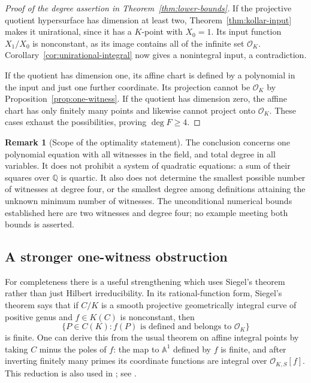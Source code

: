 \documentclass[11pt]{article}
\theoremstyle{definition}
\newtheorem{remark}[theorem]{Remark}
\begin{document}
\begin{proof}[Proof of the degree assertion in Theorem~\ref{thm:lower-bounds}]
If the projective quotient hypersurface has dimension at least two,
Theorem~\ref{thm:kollar-input} makes it unirational, since it has a
$K$-point with $X_0=1$.  Its input function $X_1/X_0$ is nonconstant,
as its image contains all of the infinite set $\mathcal O_K$.
Corollary~\ref{cor:unirational-integral} now gives a nonintegral input,
a contradiction.

If the quotient has dimension one, its affine chart is defined by a
polynomial in the input and just one further coordinate.  Its projection
cannot be $\mathcal O_K$ by Proposition~\ref{prop:one-witness}.
If the quotient has dimension zero, the affine chart has only finitely
many points and likewise cannot project onto $\mathcal O_K$.
These cases exhaust the possibilities, proving $\deg F\ge4$.
\end{proof}

\begin{remark}[Scope of the optimality statement]
The conclusion concerns one polynomial equation with all witnesses in the
field, and total degree in all variables.  It does not prohibit a system
of quadratic equations: a sum of their squares over $\mathbb Q$ is quartic.
It also does not determine the smallest possible number of witnesses at
degree four, or the smallest degree among definitions attaining the
unknown minimum number of witnesses.  The unconditional numerical
bounds established here are two witnesses and degree four; no example
meeting both bounds is asserted.
\end{remark}

\subsection{A stronger one-witness obstruction}

For completeness there is a useful strengthening which uses Siegel's
theorem rather than just Hilbert irreducibility.
In its rational-function form, Siegel's theorem says that if $C/K$ is a
smooth projective geometrically integral curve of positive genus and
$f\in K(C)$ is nonconstant, then
\[
              \{P\in C(K):f(P)\text{ is defined and belongs to }
                       \mathcal O_K\}
\]
is finite.  One can derive this from the usual theorem on affine integral
points by taking $C$ minus the poles of $f$: the map to $\mathbb A^1$
defined by $f$ is finite, and after inverting finitely many primes its
coordinate functions are integral over $\mathcal O_{K,S}[f]$.
This reduction is also used in
\cite[Section~2.1]{lbMuller2001}; see \cite[Chapter~8]{lbLang1983}.
\end{document}
